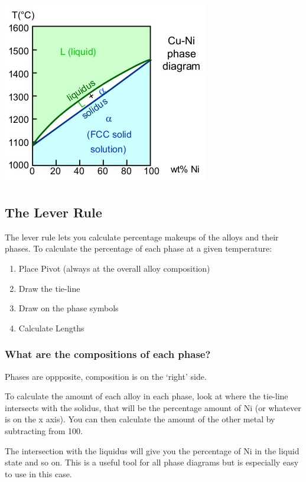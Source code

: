 \documentclass[12pt]{article}
\begin{document}
\begin{center}
  \includegraphics[scale=0.5]{binaryisomorphous}
\end{center}

\subsection{The Lever Rule}
The lever rule lets you calculate percentage makeups of the alloys and their phases.
To calculate the percentage of each phase at a given temperature:
\begin{enumerate}
  \item Place Pivot (always at the overall alloy composition)
  \item Draw the tie-line
  \item Draw on the phase symbols 
  \item Calculate Lengths
\end{enumerate}

\subsubsection{What are the compositions of each phase?}
Phases are oppposite, composition is on the `right' side.

To calculate the amount of each alloy in each phase, look at where the tie-line intersects with the solidus, that will be the percentage amount of Ni (or whatever is on the x axis).
You can then calculate the amount of the other metal by subtracting from 100. 

The intersection with the liquidus will give you the percentage of Ni in the liquid state and so on.
This is a useful tool for all phase diagrams but is especially easy to use in this case.
\end{document}
